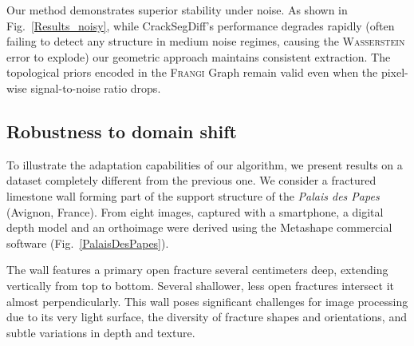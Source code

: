 \documentclass[conference]{IEEEtran}
\newcommand{\Frangi}[0]{\textsc{Frangi}}
\begin{document}
Our method demonstrates superior stability under noise. As shown in Fig.~\ref{Results_noisy}, while CrackSegDiff's performance degrades rapidly (often failing to detect any structure in medium noise regimes, causing the \textsc{Wasserstein} error to explode) our geometric approach maintains consistent extraction. The topological priors encoded in the \Frangi{} Graph remain valid even when the pixel-wise signal-to-noise ratio drops.





\subsection{Robustness to domain shift}

To illustrate the adaptation capabilities of our algorithm, we present results on a dataset completely different from the previous one. We consider a fractured limestone wall forming part of the support structure of the \textit{Palais des Papes} (Avignon, France). From eight images, captured with a smartphone, a digital depth model and an orthoimage were derived using the Metashape commercial software (Fig.~\ref{PalaisDesPapes}). 

The wall features a primary open fracture several centimeters deep, extending vertically from top to bottom. Several shallower, less open fractures intersect it almost perpendicularly. This wall poses significant challenges for image processing due to its very light surface, the diversity of fracture shapes and orientations, and subtle variations in depth and texture.
\end{document}

